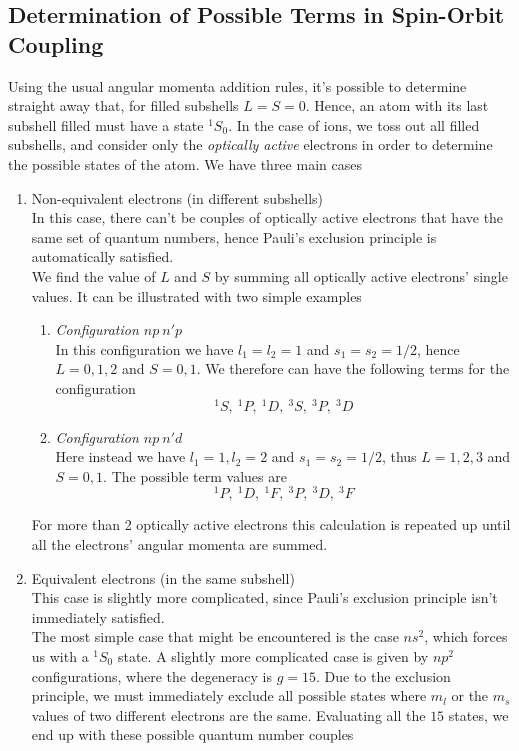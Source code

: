 \documentclass[a4paper, 11pt]{book}
\newcommand{\1}{\opr{\mathds{1}}}
\theoremstyle{plain}
\begin{document}
	\subsection{Determination of Possible Terms in Spin-Orbit Coupling}
	Using the usual angular momenta addition rules, it's possible to determine straight away that, for filled subshells $L=S=0$. Hence, an atom with its last subshell filled must have a state $^1S_0$. In the case of ions, we toss out all filled subshells, and consider only the \textit{optically active} electrons in order to determine the possible states of the atom. We have three main cases\\
	\begin{enumerate}
	\item Non-equivalent electrons (in different subshells)\\
		In this case, there can't be couples of optically active electrons that have the same set of quantum numbers, hence Pauli's exclusion principle is automatically satisfied.\\
		We find the value of $L$ and $S$ by summing all optically active electrons' single values. It can be illustrated with two simple examples
		\begin{enumerate}
		\item \textit{Configuration $np\ n'p$}\\
			In this configuration we have $l_1=l_2=1$ and $s_1=s_2=1/2$, hence $L=0,1,2$ and $S=0,1$. We therefore can have the following terms for the configuration
			\begin{equation*}
				^1S,\ ^1P,\ ^1D,\ ^3S,\ ^3P,\ ^3D
			\end{equation*}
		\item \textit{Configuration $np\ n'd$}\\
			Here instead we have $l_1=1,l_2=2$ and $s_1=s_2=1/2$, thus $L=1,2,3$ and $S=0,1$. The possible term values are
			\begin{equation*}
				^1P,\ ^1D,\ ^1F,\ ^3P,\ ^3D,\ ^3F
			\end{equation*}
		\end{enumerate}
		For more than 2 optically active electrons this calculation is repeated up until all the electrons' angular momenta are summed.
	\item Equivalent electrons (in the same subshell)\\
		This case is slightly more complicated, since Pauli's exclusion principle isn't immediately satisfied.\\
		The most simple case that might be encountered is the case $ns^2$, which forces us with a $^1S_0$ state. A slightly more complicated case is given by $np^2$ configurations, where the degeneracy is $g=15$. Due to the exclusion principle, we must immediately exclude all possible states where $m_l$ or the $m_s$ values of two different electrons are the same. Evaluating all the $15$ states, we end up with these possible quantum number couples

\end{enumerate}
\end{document}
